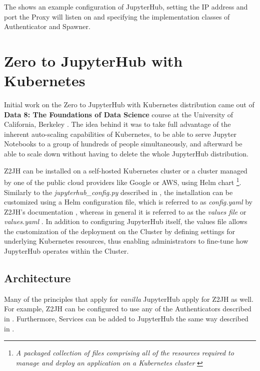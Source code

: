 \documentclass[
  digital,     %
  oneside,     %
  nosansbold,  %
  nocolorbold, %
  lof,         %
  nolot,         %
]{fithesis4}
\begin{document}
The  shows an example configuration of JupyterHub, setting the IP address and port the Proxy will listen on and specifying the implementation classes of Authenticator and Spawner.

\section{Zero to JupyterHub with Kubernetes}
\label{sec:z2jh}

Initial work on the Zero to JupyterHub with Kubernetes distribution came out of \textbf{Data 8: The Foundations of Data Science
} course at the University of California, Berkeley \cite{z2jh_uc_berkeley}. The idea behind it was to take full advantage of the inherent auto-scaling capabilities of Kubernetes, to be able to serve Jupyter Notebooks to a group of hundreds of people simultaneously, and afterward be able to scale down without having to delete the whole JupyterHub distribution.

Z2JH can be installed on a self-hosted Kubernetes cluster or a cluster managed by one of the public cloud providers like Google or AWS, using Helm chart
\footnote{\emph{A packaged collection of files comprising all of the resources required to manage and deploy an application on a Kubernetes cluster} \cite{helm_charts}}. Similarly to the \emph{jupyterhub\_config.py} described in , the installation can be customized using a Helm configuration file, which is referred to as \emph{config.yaml} by Z2JH's documentation \cite{jupyterhub_z2jh_config}, whereas in general it is referred to as the \emph{values file} or \emph{values.yaml} \cite{helm_charts}. In addition to configuring JupyterHub itself, the values file allows the customization of the deployment on the Cluster by defining settings for underlying Kubernetes resources, thus enabling administrators to fine-tune how JupyterHub operates within the Cluster.

\subsection{Architecture}
Many of the principles that apply for \emph{vanilla} JupyterHub apply for Z2JH as well. For example, Z2JH can be configured to use any of the Authenticators described in . Furthermore, Services can be added to JupyterHub the same way described in .
\end{document}
